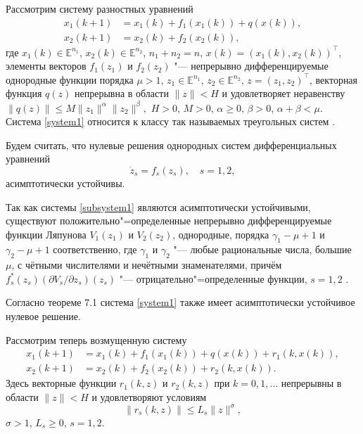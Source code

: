 \smallskip
{}
Рассмотрим систему разностных уравнений
\begin{equation}
\begin{aligned}
x_1(k+1)&=x_1(k)+f_1(x_1(k))+q(x(k)),\\
x_2(k+1)&=x_2(k)+f_2(x_2(k)),
\end{aligned}
\label{system1}
\end{equation}
где $x_1(k)\in \mathbb E^{n_1}$, $x_2(k)\in \mathbb E^{n_2}$,
$n_1+n_2=n$, $x(k)=(x_1(k), x_2(k))^\top $, элементы векторов $f_1(z_1)$ и
$f_2(z_2)$ "--- непрерывно дифференцируемые однородные функции
порядка $\mu>1$, $z_1\in \mathbb E^{n_1}$, $z_2\in \mathbb E^{n_2}$, $z=(z_1, z_2)^\top $, векторная функция $q(z)$ непрерывна в области
$\|z\|<H$ и удовлетворяет неравенству $\|q(z)\|\leq M\|z_1\|^{\alpha}\|z_2\|^{\beta},$
$H>0$, $M>0$, $\alpha\geq0$, $\beta>0$, $\alpha+\beta<\mu$.
Система \eqref{system1} относится к классу так называемых
треугольных систем \cite{sultan:bib10}.

Будем считать, что нулевые решения однородных систем
дифференциальных уравнений
\begin{equation}
\dot{z}_s=f_s(z_s),\quad s=1, 2,\label{subsystem1}
\end{equation}
асимптотически устойчивы.

Так как системы \eqref{subsystem1} являются асимптотически
устойчивыми,  существуют положительно"=определенные непрерывно
дифференцируемые функции Ляпунова $V_1(z_1)$ и $V_2(z_2)$,
однородные, порядка $\gamma_1-\mu+1$ и ${\gamma_2-\mu+1}$
соответственно, где $\gamma_1$ и $\gamma_2$ "--- любые рациональные
числа, большие $\mu$, с чётными числителями и нечётными
знаменателями, причём $f_s^{*}(z_s)({\partial V_s}/{\partial
z_s})(z_s)$ "--- отрицательно"=определенные функции, $s=1, 2$ \cite{sultan:bib4}.

Согласно теореме 7.1 \cite[с.~87]{sultan:bib8} система \eqref{system1} также имеет асимптотически устойчивое нулевое решение.

Рассмотрим теперь возмущенную систему
\begin{equation}
\begin{aligned}
x_1(k+1)&=x_1(k)+f_1(x_1(k))+q(x(k))+r_1(k,x(k)),\\
x_2(k+1)&=x_2(k)+f_2(x_2(k))+r_2(k,x(k)).\label{perturbedsystem1}
\end{aligned}
\end{equation}
Здесь векторные функции $r_1(k, z)$ и $r_2(k, z)$ при $k=0, 1, \ldots$
непрерывны в области $\|z\|<H$ и удовлетворяют условиям
\begin{equation}
\|r_s(k, z)\|\leq L_s\|z\|^{\sigma},\label{condition1}
\end{equation}
$\sigma>1$, $L_s\geq0$, $s=1, 2$.

